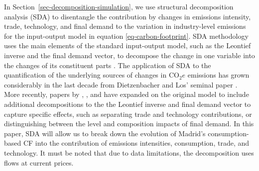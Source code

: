 \documentclass[
  10pt,
  twocolumn]{aft}
\begin{document}
In Section~\ref{sec-decomposition-simulation}, we use structural
decomposition analysis (SDA) to disentangle the contribution by changes
in emissions intensity, trade, technology, and final demand to the
variation in industry-level emissions for the input-output model in
equation \ref{eq-carbon-footprint}. SDA methodology uses the main
elements of the standard input-output model, such as the Leontief
inverse and the final demand vector, to decompose the change in one
variable into the changes of its constituent parts
\citep{artoDriversGrowthGlobal2014}. The application of SDA to the
quantification of the underlying sources of changes in \(\text{CO}_2e\)
emissions has grown considerably in the last decade from Dietzenbacher
and Los' seminal paper
\citeyearpar{dietzenbacherStructuralDecompositionTechniques1998}. More
recently, papers by \citet{hoekstra_emission_2016},
\citet{artoDriversGrowthGlobal2014}, and
\citet{xuStructuralDecompositionAnalysis2014} have expanded on the
original model to include additional decompositions to the the Leontief
inverse and final demand vector to capture specific effects, such as
separating trade and technology contributions, or distinguishing between
the level and composition impacts of final demand. In this paper, SDA
will allow us to break down the evolution of Madrid's consumption-based
CF into the contribution of emissions intensities, consumption, trade,
and technology. It must be noted that due to data limitations, the
decomposition uses flows at current prices.
\end{document}
